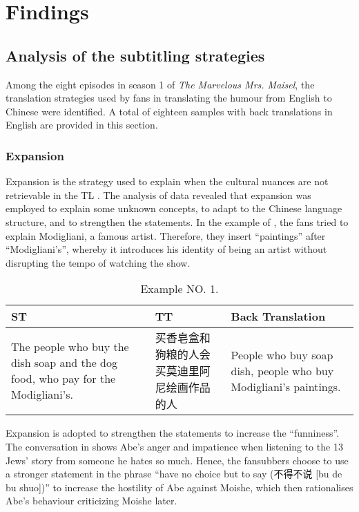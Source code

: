 \documentclass[english]{textolivre}
\begin{document}
\section{Findings}\label{sec-listas}

\subsection{Analysis of the subtitling strategies}

Among the eight episodes in season 1 of \textit{The Marvelous Mrs. Maisel}, the translation strategies used by fans in translating the humour from English to Chinese were identified. A total of eighteen samples with back translations in English are provided in this section.

\subsubsection{Expansion}\label{sec-figuras-tabelas}
Expansion is the strategy used to explain when the cultural nuances are not retrievable in the TL \cite{gottlieb_1992}. The analysis of data revealed that expansion was employed to explain some unknown concepts, to adapt to the Chinese language structure, and to strengthen the statements. In the example of , the fans tried to explain Modigliani, a famous artist. Therefore, they insert “paintings” after “Modigliani's”, whereby it introduces his identity of being an artist without disrupting the tempo of watching the show. 

\begin{table}[htpb]
\caption{Example NO. 1.}
\label{tbl01}
\begin{tabularx}{\linewidth}{XXX}
\toprule 
ST  & TT & Back Translation \\ 
\midrule
The people who buy the dish soap and the dog food, who pay for the Modigliani's. & 买香皂盒和狗粮的人会买莫迪里阿尼绘画作品的人  & People who buy soap dish, people who buy Modigliani's paintings. \\ 
\bottomrule
\end{tabularx}
\end{table}

Expansion is adopted to strengthen the statements to increase the “funniness”. The conversation in  shows Abe's anger and impatience when listening to the 13 Jews' story from someone he hates so much. Hence, the fansubbers choose to use a stronger statement in the phrase “have no choice but to say (不得不说 [bu de bu shuo])” to increase the hostility of Abe against Moishe, which then rationalises Abe's behaviour criticizing Moishe later. 
\end{document}
